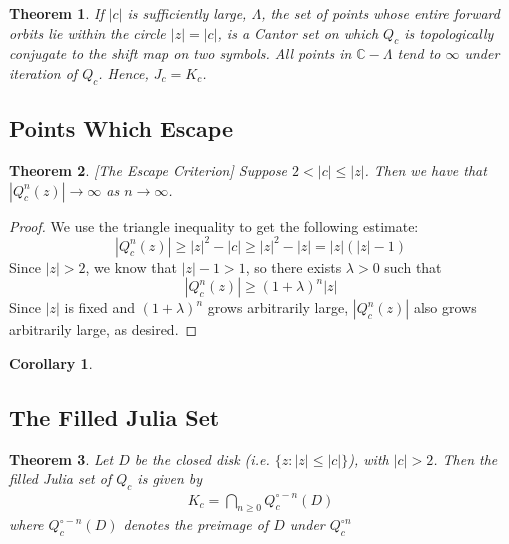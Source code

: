 \documentclass[symmetric]{tufte-handout}
\newtheorem{theorem}{Theorem}
\newtheorem{corollary}{Corollary}
\begin{document}
\begin{theorem}
If $|c|$ is sufficiently large, $\Lambda$, the set of points whose entire forward orbits lie within the circle $|z|=|c|$, is a Cantor set on which $Q_c$ is topologically conjugate to the shift map on two symbols. All points in $\mathbb{C} - \Lambda$ tend to $\infty$ under iteration of $Q_c$. Hence, $J_c=K_c$.
\end{theorem}



\subsection{Points Which Escape}



\begin{theorem} \label{escape} [The Escape Criterion]
Suppose $2 < |c| \le |z|$. Then we have that $|Q_c^n(z)| \rightarrow \infty$ as $n \rightarrow \infty$.

\end{theorem}
\begin{proof}
We use the triangle inequality to get the following estimate:
\begin{equation}
    |Q_c^n(z)| \geq |z|^2 - |c| \geq |z|^2 - |z| = |z|(|z|-1)
\end{equation}
Since $|z| > 2$, we know that $|z|-1>1$, so there exists $\lambda > 0$ such that 
\begin{equation}
    |Q_c^n(z)| \geq (1+\lambda)^n|z|
\end{equation}
Since $|z|$ is fixed and $(1+\lambda)^n$ grows arbitrarily large, $|Q_c^n(z)|$ also grows arbitrarily large, as desired.

\end{proof}



\begin{corollary}

\end{corollary}



\subsection{The Filled Julia Set}

\begin{theorem}
Let $D$ be the closed disk (i.e. $\{z : |z| \le |c|\}$), with $|c|>2$. Then the filled Julia set of $Q_c$ is given by
\begin{align*}
K_c = \bigcap\limits_{n\ge 0} Q_c^{\circ -n} (D)
\end{align*}
where $Q_c^{\circ -n} (D)$ denotes the preimage of $D$ under $Q_c^{\circ n}$
\end{theorem}
\end{document}
